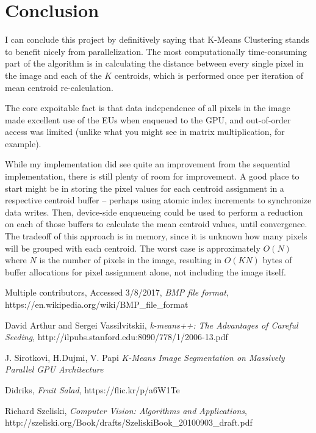 \documentclass[11pt]{article}
\begin{document}
\section{Conclusion}

I can conclude this project by definitively saying that K-Means Clustering stands to benefit nicely from
parallelization. The most computationally time-consuming part of the algorithm is in calculating the
distance between every single pixel in the image and each of the $K$ centroids, which is performed once
per iteration of mean centroid re-calculation.

The core expoitable fact is that data independence of all pixels in the image
made excellent use of the EUs when enqueued to the GPU, and out-of-order access was limited (unlike what
you might see in matrix multiplication, for example).

While my implementation did see quite an improvement from the sequential implementation, there is still
plenty of room for improvement. A good place to start might be in storing the pixel values for each
centroid assignment in a respective centroid buffer -- perhaps using atomic index increments to synchronize
data writes. Then, device-side enqueueing could be used to perform a reduction on each of those buffers
to calculate the mean centroid values, until convergence. The tradeoff of this approach is in memory, since it is
unknown how many pixels will be grouped with each centroid. The worst case is approximately $O(N)$ where
$N$ is the number of pixels in the image, resulting in $O(KN)$ bytes of buffer allocations for pixel assignment
alone, not including the image itself.

\begin{thebibliography}{9}

  Multiple contributors,
  Accessed 3/8/2017,
  \emph{BMP file format},
  https://en.wikipedia.org/wiki/BMP\_file\_format

  David Arthur and Sergei Vassilvitskii,
  \emph{k-means++: The Advantages of Careful Seeding},
  http://ilpubs.stanford.edu:8090/778/1/2006-13.pdf

  J. Sirotkovi, H.Dujmi, V. Papi
  \emph{K-Means Image Segmentation on Massively Parallel GPU Architecture}

  Didriks,
  \emph{Fruit Salad},
  https://flic.kr/p/a6W1Te

  Richard Szeliski,
  \emph{Computer Vision: Algorithms and Applications},
  http://szeliski.org/Book/drafts/SzeliskiBook\_20100903\_draft.pdf


\end{thebibliography}
\end{document}
